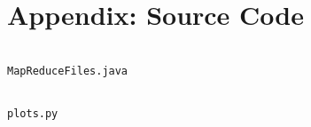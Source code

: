 \documentclass[a4paper]{article}
\newenvironment{code}{\captionsetup{type=listing}}{}
\begin{document}
\section{Appendix: Source Code}
\begin{code}
    \inputminted[linenos, breaklines, frame=single]{java}{../code/MapReduceFiles.java}
    \caption{\texttt{MapReduceFiles.java}}
\end{code}

\begin{code}
    \inputminted[linenos, breaklines, frame=single]{python}{../code/plots.py}
    \caption{\texttt{plots.py}}
\end{code}
\end{document}
